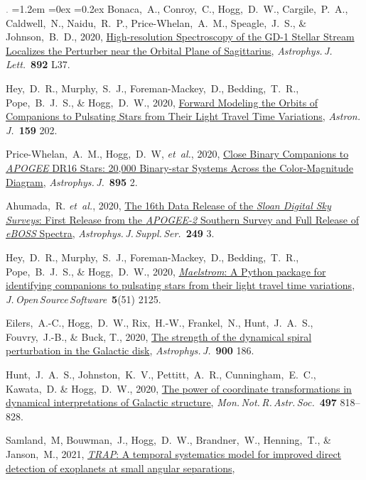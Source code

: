 \documentclass[10pt,letterpaper]{article}
\newcommand{\acronym}[1]{{\small{#1}}}
\newcommand{\foreign}[1]{\textsl{#1}}
\newcommand{\etal}{\foreign{et~al.}}
\newcommand{\project}[1]{\textsl{#1}}
\newcommand{\doi}[2]{\href{http://dx.doi.org/#1}{{#2}}}
\newcommand{\deemph}[1]{\textcolor{grey}{\footnotesize{#1}}}
\newcommand{\pubnumber}[1]{\deemph{{#1}.}}
\newcounter{refpubnum}
\newcommand{\hogglist}{%
    \rightmargin=0in
    \leftmargin=1.2em
    \topsep=0ex
    \partopsep=0pt
    \itemsep=0.2ex
    \parsep=0pt
    \itemindent=-1.0\leftmargin
    \listparindent=0.0\leftmargin
    \settowidth{\labelsep}{~}
    \usecounter{refpubnum}
  }
\begin{document}
\begin{list}{\pubnumber{\therefpubnum}}{\hogglist}
  Bonaca,~A., Conroy,~C., Hogg,~D.~W., Cargile,~P.~A., Caldwell,~N., Naidu,~R.~P.,
  Price-Whelan,~A.~M., Speagle,~J.~S., \& Johnson,~B.~D., 2020,
  \doi{10.3847/2041-8213/ab800c}{High-resolution Spectroscopy of the \acronym{GD-1} Stellar Stream Localizes the Perturber near the Orbital Plane of Sagittarius},
  \textit{Astrophys.\,J.\,Lett.}\ \textbf{892} L37.
\item
  Hey,~D.~R., Murphy,~S.~J., Foreman-Mackey,~D., Bedding,~T.~R.,
  Pope,~B.~J.~S., \& Hogg,~D.~W., 2020,
  \doi{10.3847/1538-3881/ab7d38}{Forward Modeling the Orbits of Companions to Pulsating Stars from Their Light Travel Time Variations},
  \textit{Astron.\,J.}\ \textbf{159} 202.
\item
  Price-Whelan,~A.~M., Hogg,~D.~W, \etal, 2020,
  \doi{10.3847/1538-4357/ab8acc}{Close Binary Companions to \project{\acronym{APOGEE}} \acronym{DR16} Stars: 20,000 Binary-star Systems Across the Color-Magnitude Diagram},
  \textit{Astrophys.\,J.}\ \textbf{895} 2.
\item
  Ahumada,~R. \etal, 2020,
  \doi{10.3847/1538-4365/ab929e}{The 16th Data Release of the \project{Sloan Digital Sky Surveys}: First Release from the \project{\acronym{APOGEE-2}} Southern Survey and Full Release of \project{e\acronym{BOSS}} Spectra},
  \textit{Astrophys.\,J.\,Suppl.\,Ser.}\ \textbf{249} 3.
\item
  Hey,~D.~R., Murphy,~S.~J., Foreman-Mackey,~D., Bedding,~T.~R.,
  Pope,~B.~J.~S., \& Hogg,~D.~W., 2020,
  \doi{10.21105/joss.02125}{\project{Maelstrom}: A Python package for identifying companions to pulsating stars from their light travel time variations},
  \textit{J.\,Open\,Source\,Software}\ \textbf{5}(51) 2125.
\item
  Eilers,~A.-C., Hogg,~D.~W., Rix,~H.-W., Frankel,~N., Hunt,~J.~A.~S., Fouvry,~J.-B.,
  \& Buck, T., 2020,
  \doi{10.3847/1538-4357/abac0b}{The strength of the dynamical spiral perturbation in the Galactic disk},
  \textit{Astrophys.\,J.}\ \textbf{900} 186.
\item
  Hunt,~J.~A.~S., Johnston,~K.~V., Pettitt,~A.~R., Cunningham,~E.~C., Kawata,~D. \& Hogg,~D.~W., 2020,
  \doi{10.1093/mnras/staa1987}{The power of coordinate transformations in dynamical interpretations of Galactic structure},
  \textit{Mon.\,Not.\,R.\,Astr.\,Soc.}\ \textbf{497} 818--828.
\item
  Samland,~M, Bouwman,~J., Hogg,~D.~W., Brandner,~W., Henning,~T., \& Janson,~M., 2021,
  \doi{10.1051/0004-6361/201937308}{\project{\acronym{TRAP}}: A temporal systematics model for improved direct detection of exoplanets at small angular separations},

\end{list}
\end{document}

